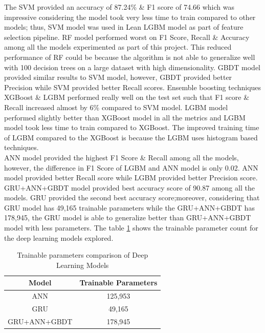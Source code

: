 \documentclass[twoside,11pt,a4paper]{article}
\begin{document}
The \acs{SVM} provided an accuracy of 87.24\% \& F1 score of 74.66 which was impressive considering the model took very less time to train compared to other models; thus, \acs{SVM} model was used in Lean \acs{LGBM} model as part of feature selection pipeline. \acs{RF} model performed worst on F1 Score, Recall \& Accuracy among all the models experimented as part of this project. This reduced performance of \acs{RF} could be because the algorithm is not able to generalize well with 100 decision trees on a large dataset with high dimensionality. \acs{GBDT} model provided similar results to \acs{SVM} model, however, \acs{GBDT} provided better Precision while \acs{SVM} provided better Recall scores. Ensemble boosting techniques \acs{XGBoost} \& \acs{LGBM} performed really well on the test set such that F1 score \& Recall increased almost by  6\% compared to \acs{SVM} model. \acs{LGBM} model performed slightly better than \acs{XGBoost} model in all the metrics and \acs{LGBM} model took less time to train compared to \acs{XGBoost}. The improved training time of \acs{LGBM} compared to the \acs{XGBoost} is because the \acs{LGBM} uses histogram based techniques.\\

\acs{ANN} model provided the highest F1 Score \& Recall among all the models, however, the difference in F1 Score of \acs{LGBM} and \acs{ANN} model is only 0.02. \acs{ANN}  model provided better Recall score while \acs{LGBM} provided better Precision score. \acs{GRU}+\acs{ANN}+\acs{GBDT} model provided best accuracy score of 90.87 among all the models. \acs{GRU} provided the second best accuracy score;moreover, considering that \acs{GRU} model has 49,165 trainable parameters while the \acs{GRU}+\acs{ANN}+\acs{GBDT} has 178,945, the \acs{GRU} model is able to generalize better than \acs{GRU}+\acs{ANN}+\acs{GBDT} model with less parameters. The table \ref{table:trainable_params} shows the trainable parameter count for the deep learning models explored.

\begin{table}[h]
	\begin{center}
		\begin{tabular}{|| c | c ||} 
			\hline
			Model & Trainable Parameters \\ [0.5ex] 
			\hline\hline
			ANN	& 125,953 \\
			\hline
			GRU	& 49,165 \\
			\hline
			GRU+ANN+GBDT	& 178,945 \\
			\hline
		\end{tabular}
		\caption{Trainable parameters comparison of Deep Learning Models}
		\label{table:trainable_params}
	\end{center}
\end{table}
\end{document}
